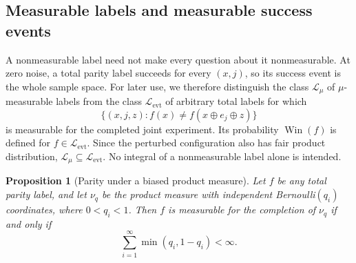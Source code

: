 \documentclass[11pt,a4paper]{article}
\newtheorem{proposition}[theorem]{Proposition}
\theoremstyle{definition}
\theoremstyle{remark}
\newcommand{\Win}{\operatorname{Win}}
\begin{document}
\subsection{Measurable labels and measurable success events}

A nonmeasurable label need not make every question about it
nonmeasurable.  At zero noise, a total parity label succeeds for every
$(x,j)$, so its success event is the whole sample space.  For later use,
we therefore distinguish the class $\mathcal L_{\mu}$ of $\mu$-measurable
labels from the class $\mathcal L_{\mathrm{evt}}$ of arbitrary total labels for which
\begin{equation}
 \{(x,j,z):f(x)\ne f(x\oplus e_j\oplus z)\}
 \label{np:found:success-event}
\end{equation}
is measurable for the completed joint experiment.  Its probability
$\Win(f)$ is defined for $f\in\mathcal L_{\mathrm{evt}}$.  Since the perturbed
configuration also has fair product distribution, $\mathcal L_{\mu}\subseteq
\mathcal L_{\mathrm{evt}}$.  No integral of a nonmeasurable label alone is intended.

\begin{proposition}[Parity under a biased product measure]
\label{np:found:biased}
Let $f$ be any total parity label, and let $\nu_q$ be the product measure
with independent Bernoulli$(q_i)$ coordinates, where $0<q_i<1$.  Then
$f$ is measurable for the completion of $\nu_q$ if and only if
\begin{equation}
 \sum_{i=1}^{\infty}\min(q_i,1-q_i)<\infty.
 \label{np:found:biased-threshold}
\end{equation}
\end{proposition}
\end{document}
